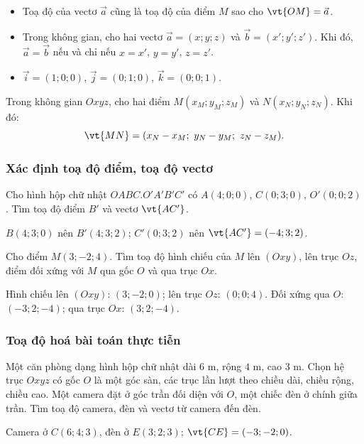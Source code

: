 \begin{nhanxet}
\begin{itemize}
  \item Toạ độ của vectơ $\vec a$ cũng là toạ độ của điểm $M$ sao cho $\vt{OM}=\vec a$.
  \item Trong không gian, cho hai vectơ $\vec a=(x;y;z)$ và $\vec b=(x';y';z')$. Khi đó, $\vec a=\vec b$ nếu và chỉ nếu $x=x'$, $y=y'$, $z=z'$.
  \item $\vec i=(1;0;0)$, $\vec j=(0;1;0)$, $\vec k=(0;0;1)$.
\end{itemize}
\end{nhanxet}

\begin{congthuc}
Trong không gian $Oxyz$, cho hai điểm $M(x_M;y_M;z_M)$ và $N(x_N;y_N;z_N)$. Khi đó:
\[\vt{MN}=(x_N-x_M;\ y_N-y_M;\ z_N-z_M).\]
\end{congthuc}

\viduminhhoa
\subsubsection{Xác định toạ độ điểm, toạ độ vectơ}
\begin{vidu}
Cho hình hộp chữ nhật $OABC.O'A'B'C'$ có $A(4;0;0)$, $C(0;3;0)$, $O'(0;0;2)$. Tìm toạ độ điểm $B'$ và vectơ $\vt{AC'}$.
\begin{loigiai}
\giai $B(4;3;0)$ nên $B'(4;3;2)$; $C'(0;3;2)$ nên $\vt{AC'}=(-4;3;2)$.
\end{loigiai}
\end{vidu}
\begin{vidu}
Cho điểm $M(3;-2;4)$. Tìm toạ độ hình chiếu của $M$ lên $(Oxy)$, lên trục $Oz$, điểm đối xứng với $M$ qua gốc $O$ và qua trục $Ox$.
\begin{loigiai}
\giai Hình chiếu lên $(Oxy)$: $(3;-2;0)$; lên trục $Oz$: $(0;0;4)$. Đối xứng qua $O$: $(-3;2;-4)$; qua trục $Ox$: $(3;2;-4)$.
\end{loigiai}
\end{vidu}
\subsubsection{Toạ độ hoá bài toán thực tiễn}
\begin{vidu}
Một căn phòng dạng hình hộp chữ nhật dài $6$ m, rộng $4$ m, cao $3$ m. Chọn hệ trục $Oxyz$ có gốc $O$ là một góc sàn, các trục lần lượt theo chiều dài, chiều rộng, chiều cao. Một camera đặt ở góc trần đối diện với $O$, một chiếc đèn ở chính giữa trần. Tìm toạ độ camera, đèn và vectơ từ camera đến đèn.
\begin{loigiai}
\giai Camera ở $C(6;4;3)$, đèn ở $E(3;2;3)$; $\vt{CE}=(-3;-2;0)$.
\end{loigiai}
\end{vidu}

